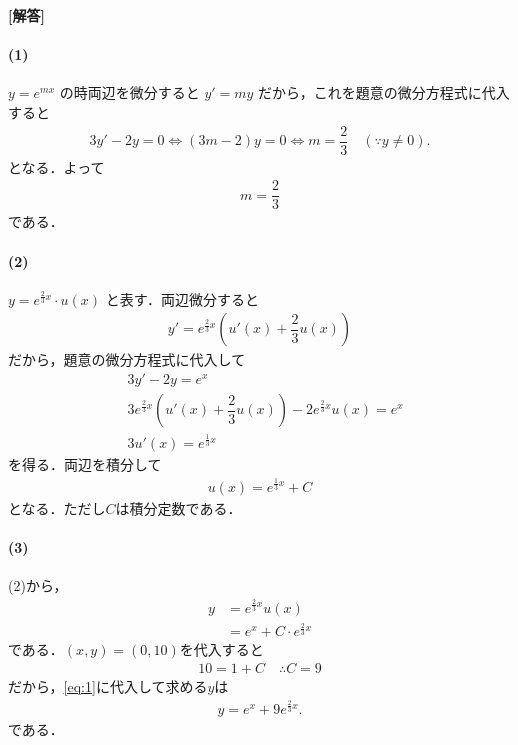 \documentclass[../../main.tex]{subfiles}
\begin{document}
\begin{oframed}
  
\end{oframed}

{\bf [解答]}
\paragraph{(1)}
$y = e^{mx}$ の時両辺を微分すると $y' = my$ だから，これを題意の微分方程式に代入すると
\begin{align}
  3y' - 2y = 0 \iff (3m-2)y = 0 \iff m = \dfrac{2}{3} \quad (\because y \neq 0).
\end{align}
となる．よって
\begin{align}
  m = \dfrac{2}{3}
\end{align}
である．

\paragraph{(2)}
$y = e^{\frac{2}{3}x} \cdot u(x)$ と表す．両辺微分すると
\begin{align}
  y' = e^{\frac{2}{3}x} \left(u'(x) + \dfrac{2}{3}u(x)\right)
\end{align}
だから，題意の微分方程式に代入して
\begin{align}
  & 3y' - 2y = e^x \\
  & 3 e^{\frac{2}{3}x} \left(u'(x) + \dfrac{2}{3}u(x)\right) - 2 e^{\frac{2}{3}x} u(x) = e^x \\
  & 3 u'(x) = e^{\frac{1}{3}x}
\end{align}
を得る．両辺を積分して
\begin{align}
  u(x) = e^{\frac{1}{3}x} + C
\end{align}
となる．ただし$C$は積分定数である．

\paragraph{(3)}
(2)から，
\begin{align}
  y
  &= e^{\frac{2}{3}x} u(x) \\
  &= e^x + C \cdot e^{\frac{2}{3}x} \label{eq:1}
\end{align}
である．$(x,y)=(0,10)$を代入すると
\begin{align}
  10 = 1 + C \quad \therefore C = 9
\end{align}
だから，\cref{eq:1}に代入して求める$y$は
\begin{align}
  y = e^x + 9 e^{\frac{2}{3}x}.
\end{align}
である．
\end{document}

